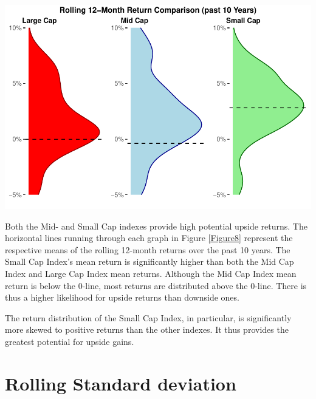 \documentclass[11pt,preprint, authoryear]{elsarticle}
\let\origfigure\figure
\let\endorigfigure\endfigure
\renewenvironment{figure}[1][2] {
    \expandafter\origfigure\expandafter[H]
} {
    \endorigfigure
}
\numberwithin{equation}{section}
\numberwithin{figure}{section}
\numberwithin{table}{section}
\begin{document}
\begin{figure}[H]

{\centering \includegraphics{Volatility-of-Shares_files/figure-latex/Figure8-1} 

}

\caption{Rolling 12-Month Returns Comparison (past 10 Years) \label{Figure8}}\label{fig:Figure8}
\end{figure}

Both the Mid- and Small Cap indexes provide high potential upside
returns. The horizontal lines running through each graph in Figure
\ref{Figure8} represent the respective means of the rolling 12-month
returns over the past 10 years. The Small Cap Index's mean return is
significantly higher than both the Mid Cap Index and Large Cap Index
mean returns. Although the Mid Cap Index mean return is below the
0-line, most returns are distributed above the 0-line. There is thus a
higher likelihood for upside returns than downside ones.

The return distribution of the Small Cap Index, in particular, is
significantly more skewed to positive returns than the other indexes. It
thus provides the greatest potential for upside gains.

\hypertarget{rolling-standard-deviation}{%
\section{\texorpdfstring{Rolling Standard deviation
\label{Standard deviation}}{Rolling Standard deviation }}\label{rolling-standard-deviation}}
\end{document}
